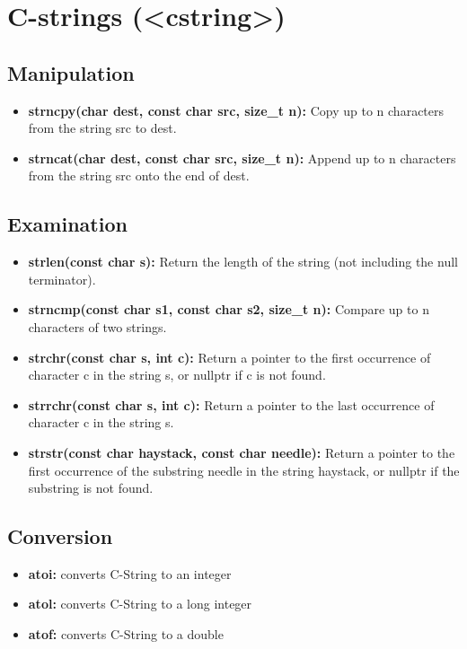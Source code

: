 \documentclass{report}
\begin{document}
    \section{\LARGE C-strings (<cstring>)}
    \bigbreak \noindent 
    \subsection{Manipulation}
    \begin{itemize}
        \item \textbf{strncpy(char dest, const char src, size\_t n):} Copy up to n characters from the string src to dest.
        \item \textbf{strncat(char dest, const char src, size\_t n):} Append up to n characters from the string src onto the end of dest.
    \end{itemize}

    \bigbreak \noindent 
    \subsection{Examination}
    \begin{itemize}
        \item \textbf{strlen(const char s):} Return the length of the string (not including the null terminator).
        \item \textbf{strncmp(const char s1, const char s2, size\_t n):} Compare up to n characters of two strings.
        \item \textbf{strchr(const char s, int c):} Return a pointer to the first occurrence of character c in the string s, or nullptr if c is not found.
        \item \textbf{strrchr(const char s, int c):} Return a pointer to the last occurrence of character c in the string s.
        \item \textbf{strstr(const char haystack, const char needle):} Return a pointer to the first occurrence of the substring needle in the string haystack, or nullptr if the substring is not found.
    \end{itemize}

    \bigbreak \noindent 
    \subsection{Conversion}
    \begin{itemize}
        \item \textbf{atoi:} converts C-String to an integer 
        \item \textbf{atol:} converts C-String to a long integer 
        \item \textbf{atof:} converts C-String to a double
    \end{itemize}
\end{document}

